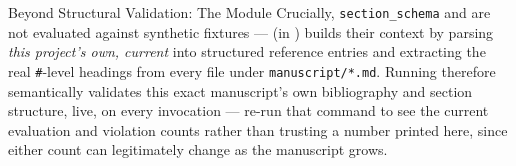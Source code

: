 \documentclass[
  ignorenonframetext,
]{beamer}
\begin{document}
\begin{frame}{Beyond Structural Validation:
The  Module}
Crucially, \texttt{section\_schema} and  are
not evaluated against synthetic fixtures ---
 (in
) builds their context by
parsing \emph{this project's own, current}
 into structured reference entries and
extracting the real \texttt{\#}-level headings from every file under
\texttt{manuscript/*.md}. Running
therefore semantically validates this exact manuscript's own
bibliography and section structure, live, on every invocation --- re-run
that command to see the current evaluation and violation counts rather
than trusting a number printed here, since either count can legitimately
change as the manuscript grows.
\end{frame}
\end{document}
